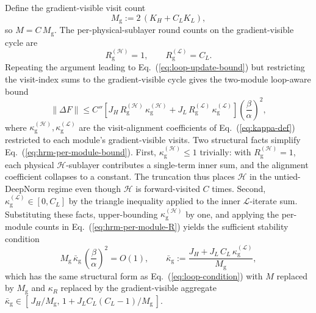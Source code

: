 \documentclass[11pt]{airesearch}
\begin{document}
Define the gradient-visible visit count
\begin{equation}
  M_{\mathrm{g}}
  := 2\,(K_H + C_L K_L),
  \label{eq:hrm-Mg}
\end{equation}
so $M = C\,M_{\mathrm{g}}$. The per-physical-sublayer round counts on the
gradient-visible cycle are
\begin{equation}
  R_{\mathrm{g}}^{(\mathcal{H})} = 1,
  \qquad
  R_{\mathrm{g}}^{(\mathcal{L})} = C_L.
  \label{eq:hrm-per-module-R}
\end{equation}
Repeating the argument leading to Eq.~(\ref{eq:loop-update-bound}) but
restricting the visit-index sums to the gradient-visible cycle gives the
two-module loop-aware bound
\begin{equation}
  \|\Delta F\|
  \le
  C''\!
  \left[
    J_H\,R_{\mathrm{g}}^{(\mathcal{H})}\,\kappa_{\mathrm{g}}^{(\mathcal{H})}
    +
    J_L\,R_{\mathrm{g}}^{(\mathcal{L})}\,\kappa_{\mathrm{g}}^{(\mathcal{L})}
  \right]
  \left(\frac{\beta}{\alpha}\right)^2,
  \label{eq:hrm-per-module-bound}
\end{equation}
where $\kappa_{\mathrm{g}}^{(\mathcal{H})},\kappa_{\mathrm{g}}^{(\mathcal{L})}$
are the visit-alignment coefficients of Eq.~(\ref{eq:kappa-def}) restricted
to each module's gradient-visible visits. Two structural facts simplify
Eq.~(\ref{eq:hrm-per-module-bound}). First,
$\kappa_{\mathrm{g}}^{(\mathcal{H})}\le 1$ trivially: with
$R_{\mathrm{g}}^{(\mathcal{H})}=1$, each physical $\mathcal{H}$-sublayer
contributes a single-term inner sum, and the alignment coefficient collapses
to a constant. The truncation thus places $\mathcal{H}$ in the
untied-DeepNorm regime even though $\mathcal{H}$ is forward-visited $C$
times. Second, $\kappa_{\mathrm{g}}^{(\mathcal{L})}\in[0,C_L]$ by the
triangle inequality applied to the inner $\mathcal{L}$-iterate sum.
Substituting these facts, upper-bounding $\kappa_{\mathrm{g}}^{(\mathcal{H})}$ by one, and applying the per-module counts in
Eq.~(\ref{eq:hrm-per-module-R}) yields the sufficient stability condition
\begin{equation}
  M_{\mathrm{g}}\,\bar\kappa_{\mathrm{g}}\,
  \left(\frac{\beta}{\alpha}\right)^2
  = O(1),
  \qquad
  \bar\kappa_{\mathrm{g}}
  :=
  \frac{J_H + J_L\,C_L\,\kappa_{\mathrm{g}}^{(\mathcal{L})}}{M_{\mathrm{g}}},
  \label{eq:hrm-cond}
\end{equation}
which has the same structural form as Eq.~(\ref{eq:loop-condition}) with $M$
replaced by $M_{\mathrm{g}}$ and $\kappa_R$ replaced by the gradient-visible
aggregate $\bar\kappa_{\mathrm{g}}\in[\,J_H/M_{\mathrm{g}},\,1+J_L C_L(C_L-1)/M_{\mathrm{g}}\,]$.
\end{document}
